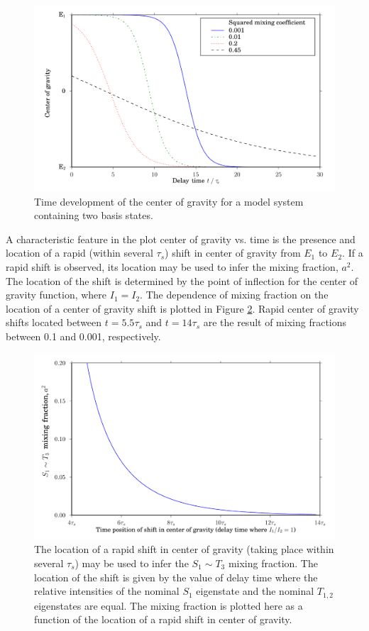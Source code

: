 \documentclass[12pt]{mitthesis}
\begin{document}
\begin{figure}
  \caption{Time development of the center of gravity for a model
    system containing two basis states.}
  \label{fig:cog-devel}
  \centering
  \includegraphics[width=6in]{cog-development.pdf}
\end{figure}

A characteristic feature in the plot center of gravity vs. time is the
presence and location of a rapid (within several $\tau_s$) shift in
center of gravity from $E_1$ to $E_2$.  If a rapid shift is observed,
its location may be used to infer the mixing fraction, $a^2$.  The
location of the shift is determined by the point of inflection for the
center of gravity function, where $I_1=I_2$.  The dependence of mixing
fraction on the location of a center of gravity shift is plotted in
Figure \ref{fig:cog-inflection-point}.  Rapid center of gravity shifts
located between $t=5.5\tau_s$ and $t=14\tau_s$ are the result of mixing
fractions between 0.1 and 0.001, respectively.

\begin{figure}
  \caption{The location of a rapid shift in center of gravity (taking
    place within several $\tau_s$) may be used to infer the $S_1 \sim
    T_3$ mixing fraction.  The location of the shift is given by the
    value of delay time where the relative intensities of the nominal
    $S_1$ eigenstate and the nominal $T_{1,2}$ eigenstates are equal.
    The mixing fraction is plotted here as a function of the location
    of a rapid shift in center of gravity.}
  \label{fig:cog-inflection-point}

  \centering
  \includegraphics[width=6in]{cog-inflection-point.pdf}
\end{figure}
\end{document}

